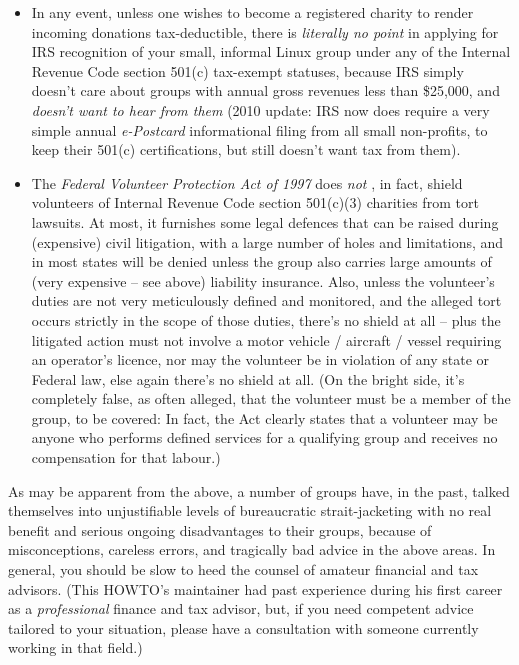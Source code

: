 \documentclass{HOWTO}
\begin{document}
\begin{itemize}
\item In any event, unless one wishes to become a registered charity to render incoming donations tax-deductible, there is {\itshape literally no point\/} in applying for  IRS  recognition of your small, informal Linux group under any of the Internal Revenue Code section 501(c) tax-exempt statuses, because IRS simply doesn't care about groups with annual gross revenues less than \$25,000, and 
\emph{doesn't want to hear from them} \texttt{\aeourl}
  (2010 update:  IRS now does require a very simple annual 
\emph{e-Postcard} \texttt{\aepurl}
 informational filing from all small non-profits, to keep their 501(c) certifications, but still doesn't want tax from them).

\item The 
\emph{Federal Volunteer Protection Act of 1997} \texttt{\aequrl}
 does 
\emph{not} \texttt{\aerurl}
, in fact, shield volunteers of Internal Revenue Code section 501(c)(3) charities from tort lawsuits.  At most, it furnishes some legal defences that can be raised during (expensive) civil litigation, with a large number of holes and limitations, and in most states will be denied unless the group also carries large amounts of (very expensive -- see above) liability insurance.  Also, unless the volunteer's duties are not very meticulously defined and monitored, and the alleged tort occurs strictly in the scope of those duties, there's no shield at all -- plus the litigated action must not involve a motor vehicle / aircraft / vessel requiring an operator's licence, nor may the volunteer be in violation of any state or Federal law, else again there's no shield at all.  (On the bright side, it's completely false, as often alleged, that the volunteer must be a member of the group, to be covered:  In fact, the Act clearly states that a volunteer may be anyone who performs defined services for a qualifying group and receives no compensation for that labour.)

\end{itemize}


As may be apparent from the above, a number of groups have, in the past, talked themselves into unjustifiable levels of bureaucratic strait-jacketing with no real benefit and serious ongoing disadvantages to their groups, because of misconceptions, careless errors, and tragically bad advice in the above areas.  In general, you should be slow to heed the counsel of amateur financial and tax advisors.  (This HOWTO's maintainer had past experience during his first career as a {\itshape professional\/} finance and tax advisor, but, if you need competent advice tailored to your situation, please have a consultation with someone currently working in that field.)
\end{document}

